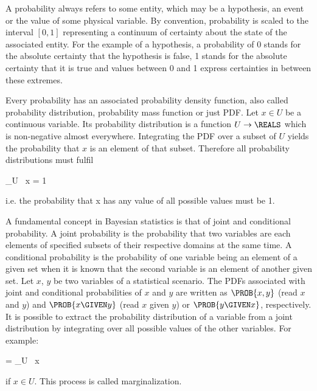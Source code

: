\startsection[title={Bayesian Statistics}]

    A probability always refers to some entity, which may be a hypothesis, an
    event or the value of some physical variable. By convention, probability is
    scaled to the interval $[0, 1]$ representing a continuum of certainty about
    the state of the associated entity. For the example of a hypothesis,
    a probability of 0 stands for the absolute certainty that the hypothesis is
    false, 1 stands for the absolute certainty that it is true and values
    between 0 and 1 express certainties in between these extremes.

    Every probability has an associated probability density function, also
    called probability distribution, probability mass function or just PDF.
    Let $x \in U$ be a continuous variable. Its probability distribution is
    a function $U \rightarrow \REALS$ which is non-negative almost everywhere.
    Integrating the PDF over a subset of $U$ yields the probability that
    $x$ is an element of that subset. Therefore all probability distributions
    must fulfil

    \placeformula[eq:probaint]
    \startformula
        \int_U  \, \diff x = 1 \EQCOMMA
    \stopformula
    
    i.e. the probability that x has any value of all possible values must
    be 1.

    A fundamental concept in Bayesian statistics is that of joint and
    conditional probability. A joint probability is the probability that two
    variables are each elements of specified subsets of their respective
    domains at the same time. A conditional probability is the probability of
    one variable being an element of a given set when it is known that the
    second variable is an element of another given set. Let $x$, $y$ be two
    variables of a statistical scenario. The PDFs associated with joint and
    conditional probabilities of $x$ and $y$ are written as $\PROB{x, y}$ (read
    $x$ and $y$) and $\PROB{x \GIVEN y}$ (read $x$ given $y$) or $\PROB{y
    \GIVEN x}$, respectively. It is possible to extract the probability
    distribution of a variable from a joint distribution by integrating
    over all possible values of the other variables. For example:

    \startformula
         = \int_U  \, \diff x
    \stopformula

    if $x \in U$. This process is called marginalization.

